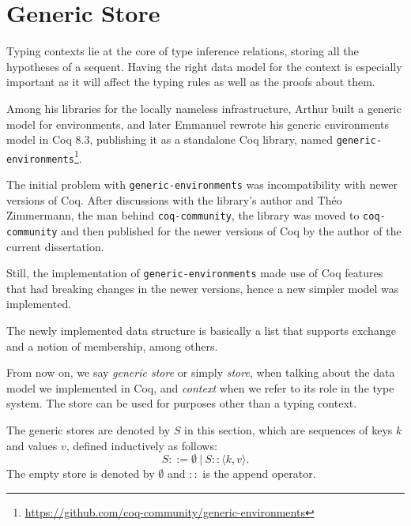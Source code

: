 \section{Generic Store}\label{chap:generic-store}

\newcommand{\angkv}{\langle k, v \rangle}
\newcommand{\angkvp}{\langle k', v' \rangle}

Typing contexts lie at the core of type inference relations, storing all the hypotheses of a sequent. Having the right data model for the context is especially important as it will affect the typing rules as well as the proofs about them.

Among his libraries for the locally nameless infrastructure, Arthur \cite{DBLP:journals/jar/Chargueraud12} built a generic model for environments, and later Emmanuel \cite{DBLP:journals/corr/abs-1112-1316} rewrote his generic environments model in Coq 8.3, publishing it as a standalone Coq library, named \texttt{generic-environments}\footnote{\url{https://github.com/coq-community/generic-environments}}.

The initial problem with \texttt{generic-environments} was incompatibility with newer versions of Coq. After discussions with the library's author and Th\'eo Zimmermann, the man behind \texttt{coq-community}, the library was moved to \texttt{coq-community} and then published for the newer versions of Coq by the author of the current dissertation.

Still, the implementation of \texttt{generic-environments} made use of Coq features that had breaking changes in the newer versions, hence a new simpler model was implemented.

The newly implemented data structure is basically a list that supports exchange and a notion of membership, among others.

From now on, we say \textit{generic store} or simply \textit{store}, when talking about the data model we implemented in Coq, and \textit{context} when we refer to its role in the type system. The store can be used for purposes other than a typing context.

\begin{definition}
The generic stores are denoted by $S$ in this section, which are sequences of keys $k$ and values $v$, defined inductively as follows:
\begin{equation*}
S ::= \emptyset~|~S :: \angkv.
\end{equation*}
The empty store is denoted by $\emptyset$ and $::$ is the append operator.
\end{definition}

